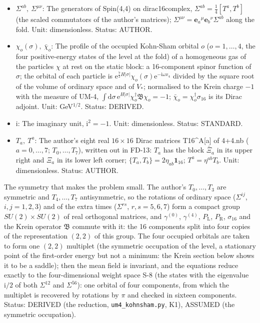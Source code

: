 \documentclass[
  10pt,
]{article}
\providecommand{\tightlist}{%
  \setlength{\itemsep}{0pt}\setlength{\parskip}{0pt}}
\begin{document}
\begin{itemize}
\tightlist
\item
  \(\Sigma^{ab},\ \Sigma^{\mu\nu}\): The generators of Spin(4,4) on
  dirac16complex, \(\Sigma^{ab} = \frac14[T^a, T^b]\) (the scaled
  commutators of the author's matrices);
  \(\Sigma^{\mu\nu} = \mathbf{e}_a{}^\mu\mathbf{e}_b{}^\nu\Sigma^{ab}\)
  along the fold. Unit: dimensionless. Status: AUTHOR.
\item
  \(\chi_o(\sigma),\ \bar\chi_o\): The profile of the occupied Kohn-Sham
  orbital \(o\) (\(o = 1, \dots, 4\), the four positive-energy states of
  the level at the fold) of a homogeneous gas of the particles \(\chi\)
  at rest on the static block: a 16-component spinor function of
  \(\sigma\); the orbital of each particle is
  \(\mathrm{e}^{\frac72H\lvert\sigma\rvert}\chi_o(\sigma)\mathrm{e}^{-\mathrm{i}\omega x_4}\)
  divided by the square root of the volume of ordinary space and of
  \(V_*\); normalised to the Krein charge \(-1\) with the measure of
  UM-4,
  \(\int\mathrm{d}\sigma\,\mathrm{e}^{H\lvert\sigma\rvert}\chi_o^\dagger\mathfrak{B}\chi_o = -1\);
  \(\bar\chi_o = \chi_o^\dagger\sigma_{16}\) is its Dirac adjoint. Unit:
  GeV\(^{1/2}\). Status: DERIVED.
\item
  \(\mathrm{i}\): The imaginary unit, \(\mathrm{i}^2 = -1\). Unit:
  dimensionless. Status: STANDARD.
\item
  \(T_a,\ T^a\): The author's eight real \(16 \times 16\) Dirac matrices
  T16\^{}A{[}a{]} of 4+4.nb (\(a = 0, \dots, 7\); \(T_0, \dots, T_7\)),
  written out in FD-13: \(T_a\) has the block \(\bar\Xi_a\) in its upper
  right and \(\Xi_a\) in its lower left corner;
  \(\{T_a, T_b\} = 2\eta_{ab}\mathbf{1}_{16}\); \(T^a = \eta^{ab}T_b\).
  Unit: dimensionless. Status: AUTHOR.
\end{itemize}

The symmetry that makes the problem small. The author's
\(T_0, \dots, T_3\) are symmetric and \(T_4, \dots, T_7\) antisymmetric,
so the rotations of ordinary space (\(\Sigma^{ij}\), \(i, j = 1, 2, 3\))
and of the extra times (\(\Sigma^{rs}\), \(r, s = 5, 6, 7\)) form a
compact group \(SU(2) \times SU(2)\) of real orthogonal matrices, and
\(\gamma^{(0)}\), \(\gamma^{(4)}\), \(P_{\mathrm{L}}\),
\(P_{\mathrm{R}}\), \(\sigma_{16}\) and the Krein operator
\(\mathfrak{B}\) commute with it: the 16 components split into four
copies of the representation \((2, 2)\) of this group. The four occupied
orbitals are taken to form one \((2, 2)\) multiplet (the symmetric
occupation of the level, a stationary point of the first-order energy
but not a minimum: the Krein section below shows it to be a saddle);
then the mean field is invariant, and the equations reduce exactly to
the four-dimensional weight space S-8 (the states with the eigenvalue
\(\mathrm{i}/2\) of both \(\Sigma^{12}\) and \(\Sigma^{56}\)): one
orbital of four components, from which the multiplet is recovered by
rotations by \(\pi\) and checked in sixteen components. Status: DERIVED
(the reduction, \texttt{um4\_kohnsham.py}, K1), ASSUMED (the symmetric
occupation).
\end{document}
